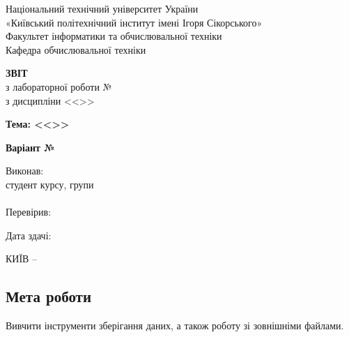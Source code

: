 \documentclass[14pt, a4paper]{extreport}
\begin{document}
	
	\begin{titlepage}
		\begin{center}
			\normalsize
			Національний технічний університет України\\
			«Київський політехнічний інститут імені Ігоря Сікорського» \\[0.5em]
			Факультет інформатики та обчислювальної техніки\\
			Кафедра обчислювальної техніки
			
			\vfill
			
			{\large \textbf{ЗВІТ}\\[0.5em]}
			{з лабораторної роботи №\LabNumber \\}
			{з дисципліни <<\CourseTitle>>}
			
			\vspace{2em}
			
			{\textbf{Тема: <<\Topic>>}}
			
			\vspace{1em}
			
			{\textbf{Варіант №\Variant}}
			
			\vfill
			
			\begin{flushright}
				Виконав: \\ студент \CourseNumber{} курсу, групи \StudentGroup \\
				\StudentName \\[1em]
				Перевірив: \\ \Teacher
			\end{flushright}
			
			\vfill
			
			\begin{flushright}
				Дата здачі: \DTMtoday
			\end{flushright}
			
			\vspace{5em}
			КИЇВ -- \ReportYear
		\end{center}
	\end{titlepage}
	
	\clearpage
	\setcounter{page}{2}
	
	\subsection*{Мета роботи} 
	
	Вивчити інструменти зберігання даних, а також роботу зі зовнішніми файлами.
	
\end{document}
